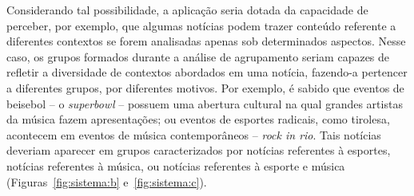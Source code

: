 \documentclass[
    12pt,                %
    oneside,            %
    a4paper,            %
    english,            %
    brazil                %
    ]{abntex2ppgsi}
\begin{document}
Considerando tal possibilidade, a aplicação seria dotada da capacidade de perceber, por exemplo, que algumas notícias podem trazer conteúdo referente a diferentes contextos se forem analisadas apenas sob determinados aspectos.
Nesse caso, os grupos formados durante a análise de agrupamento seriam capazes de refletir a diversidade de contextos abordados em uma notícia, fazendo-a pertencer a diferentes grupos, por diferentes motivos.
Por exemplo, é sabido que eventos de beisebol -- o \textit{superbowl} -- possuem uma abertura cultural na qual grandes artistas da música fazem apresentações; ou eventos de esportes radicais, como tirolesa, acontecem em eventos de música contemporâneos -- \textit{rock in rio}.
Tais notícias deveriam aparecer em grupos caracterizados por notícias referentes à esportes, notícias referentes à música, ou notícias referentes à esporte e música (Figuras~\ref{fig:sistema:b} e~\ref{fig:sistema:c}).
\end{document}
